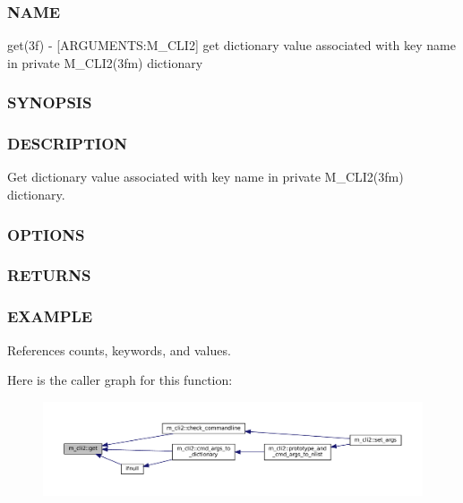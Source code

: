 \subsubsection*{N\+A\+ME}

get(3f) -\/ \mbox{[}A\+R\+G\+U\+M\+E\+N\+TS\+:M\+\_\+\+C\+L\+I2\mbox{]} get dictionary value associated with key name in private M\+\_\+\+C\+L\+I2(3fm) dictionary \subsubsection*{S\+Y\+N\+O\+P\+S\+IS}

\subsubsection*{D\+E\+S\+C\+R\+I\+P\+T\+I\+ON}

Get dictionary value associated with key name in private M\+\_\+\+C\+L\+I2(3fm) dictionary. \subsubsection*{O\+P\+T\+I\+O\+NS}

\subsubsection*{R\+E\+T\+U\+R\+NS}

\subsubsection*{E\+X\+A\+M\+P\+LE}

References counts, keywords, and values.

Here is the caller graph for this function\+:\nopagebreak
\begin{figure}[H]
\begin{center}
\leavevmode
\includegraphics[width=350pt]{namespacem__cli2_aa92e8ad0300d4e324e29eae1ab9d04b4_icgraph}
\end{center}
\end{figure}
\mbox{\label{namespacem__cli2_a448e8e24406f4bdbc14f26a940cbbc2c}} 
